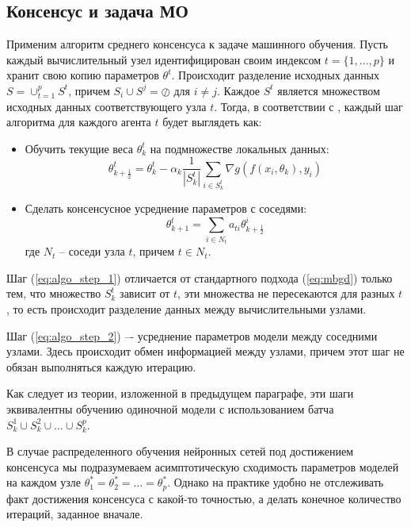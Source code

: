 \documentclass[a4paper,article,14pt]{extarticle}
\begin{document}
\subsection{Консенсус и задача МО}
Применим алгоритм среднего консенсуса к задаче машинного обучения. Пусть каждый вычислительный узел идентифицирован своим индексом $t = \{1, \ldots, p \}$ и хранит свою копию параметров $\theta^t$. Происходит разделение исходных данных $S = \cup_{t=1}^p S^t$, причем $S_i \cup S^j = \oslash \text{ для } i \ne j$. Каждое $S^t$ является множеством исходных данных соответствующего узла $t$. Тогда, в соответствии с \cite{decentralized_sgd}, каждый шаг алгоритма для каждого агента $t$ будет выглядеть как:
\begin{itemize}
\item
    Обучить текущие веса $\theta_k^t$ на подмножестве локальных данных:
     \begin{equation} \label{eq:algo_step_1}
    \theta_{k+\frac{1}{2}}^t =
    \theta_k^t - \alpha_k\frac{1}{|S_k^t|}\sum_{i\in S_k^t}\nabla g(f(x_i, \theta_k), y_i)
    \end{equation}

\item
    Сделать консенсусное усреднение параметров с соседями:
     \begin{equation} \label{eq:algo_step_2}
     \theta_{k+1}^t =
     \sum_{i \in N_t}a_{ti}\theta_{k+\frac{1}{2}}^i
     \end{equation}
где $N_t$ -- соседи узла $t$, причем $t \in N_t$.
\end{itemize}

Шаг (\ref{eq:algo_step_1}) отличается от стандартного подхода (\ref{eq:mbgd}) только тем, что множество $S_k^t$ зависит от $t$, эти множества не пересекаются для разных $t$, то есть происходит разделение данных между вычислительными узлами.

Шаг (\ref{eq:algo_step_2}) –- усреднение параметров модели  между соседними узлами. Здесь происходит обмен информацией между узлами, причем этот шаг не обязан выполняться каждую итерацию.

Как следует из теории, изложенной в предыдущем параграфе, эти шаги эквивалентны обучению одиночной модели с использованием батча $S_k^1 \cup S_k^2 \cup \ldots \cup S_k^p$.

В случае распределенного обучения нейронных сетей под достижением консенсуса мы подразумеваем асимптотическую сходимость параметров моделей на каждом узле $\theta_1^*=\theta_2^*=\ldots=\theta_p^*$.
Однако на практике удобно не отслеживать факт достижения консенсуса с какой-то точностью, а делать конечное количество итераций, заданное вначале.
\end{document}
